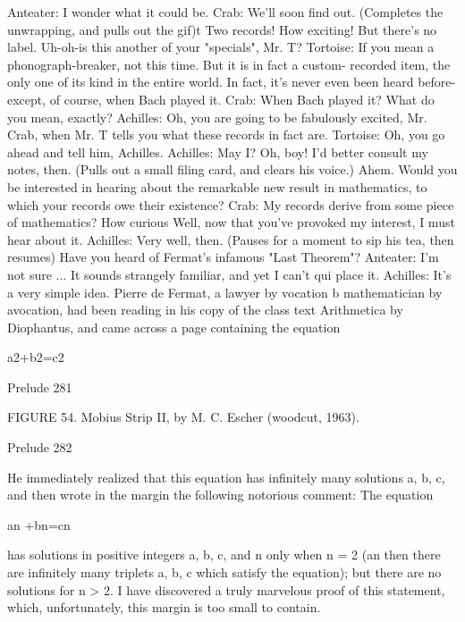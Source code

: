 Anteater: I wonder what it could be.
Crab: We'll soon find out. (Completes the unwrapping, and pulls out the gif)t Two
   records! How exciting! But there's no label. Uh-oh-is this another of your "specials",
   Mr. T?
Tortoise: If you mean a phonograph-breaker, not this time. But it is in fact a custom-
   recorded item, the only one of its kind in the entire world. In fact, it's never even been
   heard before-except, of course, when Bach played it.
Crab: When Bach played it? What do you mean, exactly?
Achilles: Oh, you are going to be fabulously excited, Mr. Crab, when Mr. T tells you
   what these records in fact are.
Tortoise: Oh, you go ahead and tell him, Achilles.
Achilles: May I? Oh, boy! I'd better consult my notes, then. (Pulls out a small filing card,
   and clears his voice.) Ahem. Would you be interested in hearing about the remarkable
   new result in mathematics, to which your records owe their existence?
Crab: My records derive from some piece of mathematics? How curious Well, now that
   you've provoked my interest, I must hear about it.
Achilles: Very well, then. (Pauses for a moment to sip his tea, then resumes) Have you
   heard of Fermat's infamous "Last Theorem"?
Anteater: I'm not sure ... It sounds strangely familiar, and yet I can't qui place it.
Achilles: It's a very simple idea. Pierre de Fermat, a lawyer by vocation b mathematician
   by avocation, had been reading in his copy of the class text Arithmetica by
   Diophantus, and came across a page containing the equation

                                         a2+b2=c2




Prelude                                                                                  281

          FIGURE 54. Mobius Strip II, by M. C. Escher (woodcut, 1963).




Prelude                                                                  282

He immediately realized that this equation has infinitely many solutions a, b, c, and then
   wrote in the margin the following notorious comment:
   The equation

                                       an +bn=cn

   has solutions in positive integers a, b, c, and n only when n = 2 (an then there are
   infinitely many triplets a, b, c which satisfy the equation); but there are no
   solutions for n > 2. I have discovered a truly marvelous proof of this statement,
   which, unfortunately, this margin is too small to contain.

